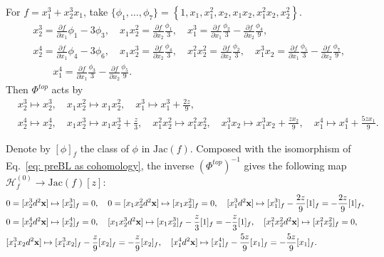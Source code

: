 \documentclass[12pt,a4paper]{amsart}
\newcommand{\Jac}{\mathrm{Jac}}
\newcommand{\bx}{{\bf x}}
\def\H{{\mathcal H}}
\newcommand{\p}{{\partial}}
\newcommand{\<}{\left<}
\renewcommand{\>}{\right>}
\numberwithin{equation}{section}
\begin{document}
For $f = x_ 1^3 + x_ 2^3 x_ 1$, take $\{ \phi_1,\dots, \phi_7 \} = \left\{1, x_ 1, x_ 1^2, x_ 2, x_ 1 x_ 2, x_ 1^2 x_ 2, x_ 2^2 \right\}$.
\begin{align*}
    & x_ 2^3 = \frac{\p f}{\p x_1}\phi _ 1 - 3\phi _ 3, \quad x_ 1 x_ 2^2 = \frac{\p f}{\p x_2} \frac{\phi _ 1} {3}, \quad x_ 1^3 = \frac{\p f}{\p x_1} \frac {\phi _ 2} {3} - \frac{\p f}{\p x_2} \frac {\phi _ 4} {9},
    \\
    & x_ 2^4 =  \frac{\p f}{\p x_1}\phi _ 4 - 3\phi _ 6, \quad x_ 1 x_ 2^3 = \frac{\p f}{\p x_2} \frac{\phi_4} {3}, \quad x_ 1^2 x_ 2^2 = \frac{\p f}{\p x_2} \frac{\phi _ 2} {3}, \quad x_ 1^3 x_ 2 = \frac{\p f}{\p x_1} \frac{\phi _ 5} {3} - \frac{\p f}{\p x_2} \frac{\phi_7} {9},
    \\
    & \qquad x_ 1^4 = \frac{\p f}{\p x_1} \frac{\phi_3} {3} - \frac{\p f}{\p x_2} \frac{\phi _ 5} {9}.
\end{align*}
Then $\Phi^{top}$ acts by
\begin{align*}
 & x_ 2^3 \mapsto  x_ 2^3, \quad x_ 1 x_ 2^2 \mapsto  x_ 1 x_ 2^2, \quad x_ 1^3 \mapsto  x_ 1^3 + \frac {2 z} {9},
 \\
 & x_ 2^4 \mapsto  x_ 2^4, \quad x_ 1 x_ 2^3 \mapsto  x_ 1 x_ 2^3 + \frac {z} {3}, \quad x_ 1^2 x_ 2^2 \mapsto  x_ 1^2 x_ 2^2,
 \quad x_ 1^3 x_ 2 \mapsto  x_ 1^3x_ 2  + \frac {z x_ 2} {9}, \quad x_ 1^4 \mapsto  x_ 1^4 + \frac {5 z x_ 1} {9}.
\end{align*}

Denote by $[\phi ]_f$ the class of $\phi$ in $\Jac(f)$. Composed with the isomorphism of Eq.~\eqref{eq: preBL as cohomology}, the inverse $(\Phi^{top})^{-1}$ gives the following map $\H_f^{(0)} \to \Jac(f)[z]$:
\begin{align*}
    & 0 = [x_ 2^3 d^2\bx] \mapsto [x_ 2^3 ]_{f} = 0, \quad  0 = [x_1x_ 2^2 d^2\bx] \mapsto [x_1x_ 2^2]_{f} = 0, \quad  [x_ 1^3 d^2\bx] \mapsto  [x_ 1^3]_f - \frac {2 z} {9}[1]_f = -\frac {2 z} {9}[1]_f,
    \\
    & 0 = [x_ 2^4 d^2\bx] \mapsto [x_ 2^4]_f = 0, \quad
    [x_ 1 x_ 2^3 d^2\bx] \mapsto [x_ 1 x_ 2^3]_f - \frac{z}{3}[1]_f = - \frac{z}{3}[1]_f, \quad
    [x_ 1^2 x_ 2^2 d^2\bx] \mapsto  [x_ 1^2 x_ 2^2]_f = 0,
    \\
    & [x_ 1^3 x_ 2 d^2\bx] \mapsto  [x_1^3 x_2 ]_f - \frac {z} {9} [x_ 2]_f = - \frac {z} {9} [x_ 2]_f, \quad
    [x_ 1^4 d^2 \bx] \mapsto  [x_ 1^4]_f - \frac {5 z} {9}[x_ 1]_f =  -\frac {5 z} {9}[x_ 1]_f.
\end{align*}

\end{document}
